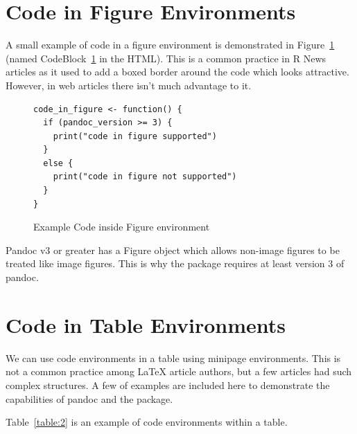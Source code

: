 \section{Code in Figure Environments}
A small example of code in a figure environment is demonstrated in Figure~\ref{code:example} (named CodeBlock~\ref{code:example} in the HTML). This is a common practice
in R News articles as it used to add a boxed border around the code which looks 
attractive. However, in web articles there isn't much advantage to it. 

\begin{figure}[htbp]
\begin{center}
\begin{verbatim}
code_in_figure <- function() {
  if (pandoc_version >= 3) {
    print("code in figure supported")
  }
  else {
    print("code in figure not supported")
  }
}
\end{verbatim}
\caption{ Example Code inside Figure environment}
\label{code:example}
\end{center}
\end{figure}

Pandoc v3 or greater \citep{pandoc} has a Figure object which allows non-image
figures to be treated like image figures. This is why the  package requires at least version 3 of pandoc.



\section{Code in Table Environments}
We can use code environments in a table using minipage environments. This is not
a common practice among LaTeX article authors, but a few articles had such complex
structures. A few of examples are included here to demonstrate the capabilities of pandoc and the  package. 

Table~\ref{table:2} is an example of code environments within a table.

